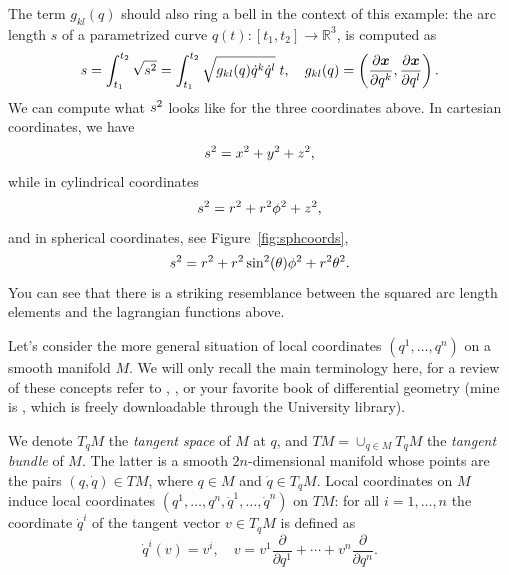 \documentclass[english,fontsize=11pt,paper=a5,oneside]{scrbook}
\newcommand{\R}{\mathbb{R}}
\newcommand{\bx}{\bm{x}}
\let\d\relax
\DeclareMathOperator{\d}{d}
\theoremstyle{definition}
\begin{document}
The term $g_{kl} (q)$ should also ring a bell in the context of this example: the arc length $s$ of a parametrized curve $q(t) : [t_1,t_2] \to \R^3$, is computed as
\begin{equation}\label{eq:arclen}
    \begin{aligned}
        s = \int_{t_1}^{t_2} \sqrt{\d s^2} = \int_{t_1}^{t_2} \sqrt{g_{kl}(q)\dot q^k \dot q^l} \;\d t,\quad
        g_{kl} (q) = \left(\frac{\partial\bx}{\partial q^k}, \frac{\partial \bx}{\partial q^l}\right).
    \end{aligned}
\end{equation}
We can compute what $\d s^2$ looks like for the three coordinates above.
In cartesian coordinates, we have
\begin{equation}
    \d s^2 = \d x^2 + \d y^2 + \d z^2,
\end{equation}
while in cylindrical coordinates
\begin{equation}
    \d s^2 = \d r^2 + r^2 \d \phi^2 + \d z^2,
\end{equation}
and in spherical coordinates, see Figure~\ref{fig:sphcoords},
\begin{equation}\label{eq:spharc}
    \d s^2 = \d r^2 + r^2 \sin^2(\theta) \d \phi^2 + r^2 \d \theta^2.
\end{equation}
You can see that there is a striking resemblance between the squared arc length elements and the lagrangian functions above.

Let's consider the more general situation of local coordinates $(q^1, \ldots, q^n)$ on a smooth manifold $M$.
We will only recall the main terminology here, for a review of these concepts refer to \cite[Chapter 4.18]{book:arnold}, \cite[Appendix A]{book:knauf}, \cite[Chapter 4]{book:marsdenratiu} or your favorite book of differential geometry (mine is \cite{book:lee}, which is freely downloadable through the University library).

We denote $T_q M$ the \emph{tangent space} of $M$ at $q$, and $TM = \cup_{q\in M} T_q M$ the \emph{tangent bundle} of $M$. The latter is a smooth $2n$-dimensional manifold whose points are the pairs $(q,\dot q)\in TM$, where $q\in M$ and $\dot q\in T_q M$. Local coordinates on $M$ induce local coordinates $(q^1,\ldots,q^n,\dot q^1, \ldots,\dot q^n)$ on $TM$: for all $i=1,\ldots,n$ the coordinate $\dot q^i$ of the tangent vector $v\in T_qM$ is defined as
\begin{equation}
    \dot q^i(v) = v^i,\quad v = v^1\frac{\partial}{\partial q^1}+\cdots+v^n \frac{\partial}{\partial q^n}.
\end{equation}
\end{document}
